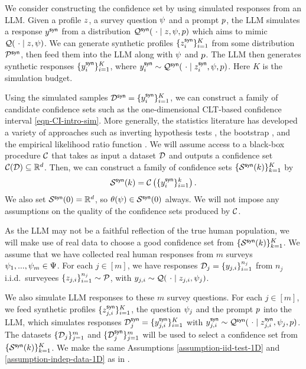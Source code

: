 We consider constructing the confidence set by using simulated responses from an LLM. Given a profile $z$, a survey question $\psi$ and a prompt $p$, the LLM simulates a response $y^{\mathsf{syn}}$ from a distribution $\mathcal{Q}^{\mathsf{syn}}(~\cdot\mid z , \psi, p)$ which aims to mimic $\mathcal{Q}(~\cdot\mid z , \psi)$. We can generate synthetic profiles $\{ z^{\mathsf{syn}}_i \}_{i=1}^K$ from some distribution $\mathcal{P}^{\mathsf{syn}}$, then feed them into the LLM along with $\psi$ and $p$. The LLM then generates synthetic responses $\{ y^{\mathsf{syn}}_i \}_{i=1}^K$, where $y^{\mathsf{syn}}_i \sim \mathcal{Q}^{\mathsf{syn}}(~\cdot\mid z^{\mathsf{syn}}_i , \psi, p)$. Here $K$ is the simulation budget.


Using the simulated samples $\mathcal{D}^{\mathsf{syn}} = \{ y^{\mathsf{syn}}_i \}_{i=1}^K$, we can construct a family of candidate confidence sets such as the one-dimensional CLT-based confidence interval \eqref{eqn-CI-intro-sim}. More generally, the statistics literature has developed a variety of approaches such as inverting hypothesis tests \citep{CBe02}, the bootstrap \citep{Efr79}, and the empirical likelihood ratio function \citep{OWe90}. We will assume access to a black-box procedure $\mathcal{C}$ that takes as input a dataset $\mathcal{D}$ and outputs a confidence set $\mathcal{C}(\mathcal{D})\subseteq\mathbb{R}^d$. Then, we can construct a family of confidence sets $\{{\mathcal{S}}^{\mathsf{syn}}(k)\}_{k=1}^{K}$ by
\begin{equation}\label{eqn-CI-sim}
{\mathcal{S}}^{\mathsf{syn}}(k) = \mathcal{C} \left( \{ y^{\mathsf{syn}}_i \}_{i=1}^k \right).
\end{equation}
We also set ${\mathcal{S}}^{\mathsf{syn}}(0) = \mathbb{R}^d$, so $\theta ( \psi ) \in {\mathcal{S}}^{\mathsf{syn}}(0)$ always. We will not impose any assumptions on the quality of the confidence sets produced by $\mathcal{C}$.

As the LLM may not be a faithful reflection of the true human population, we will make use of real data to choose a good confidence set from $\{{\mathcal{S}}^{\mathsf{syn}}(k)\}_{k=1}^{K}$. We assume that we have collected real human responses from $m$ surveys $\psi_1,...,\psi_m\in\Psi$. For each $j\in[m]$, we have responses $\mathcal{D}_j = \{ y_{j,i} \}_{i=1}^{n_j}$ from $n_j$ i.i.d.~surveyees $\{ z_{j,i} \}_{i=1}^{n_j} \sim \mathcal{P}$, with $y_{j,i} \sim \mathcal{Q}(~\cdot\mid  z_{j,i}, \psi_j )$. 

We also simulate LLM responses to these $m$ survey questions. For each $j\in[m]$, we feed synthetic profiles $\{ z^{\mathsf{syn}}_{j,i} \}_{i=1}^K$, the question $\psi_j$ and the prompt $p$ into the LLM, which simulates responses $\mathcal{D}^{\mathsf{syn}}_j = \{ y^{\mathsf{syn}}_{j,i} \}_{i=1}^{K}$ with $y^{\mathsf{syn}}_{j,i} \sim \mathcal{Q}^{\mathsf{syn}} (~\cdot \mid z^{\mathsf{syn}}_{j,i}, \psi_j, p )$. The datasets $\{ \mathcal{D}_j \}_{j=1}^m $ and $\{\mathcal{D}^{\mathsf{syn}}_j \}_{j=1}^m $ will be used to select a confidence set from $\{ {\mathcal{S}}^{\mathsf{syn}}(k) \}_{k=1}^K$. We make the same Assumptions \ref{assumption-iid-test-1D} and \ref{assumption-indep-data-1D} as in .

